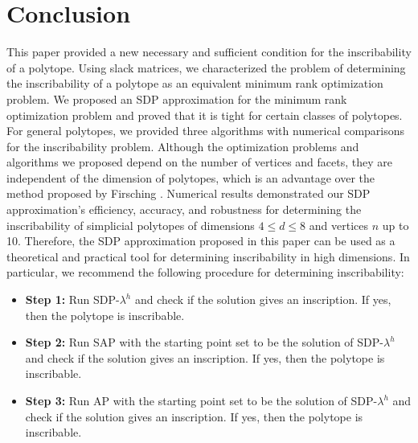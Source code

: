 \documentclass[smallextended, envcountsame]{svjour3}
\begin{document}

    

\section{Conclusion}\label{sec:conclusion}
    This paper provided a new necessary and sufficient condition for the inscribability of a polytope.  Using slack matrices, we characterized the problem of determining the inscribability of a polytope as an equivalent minimum rank optimization problem.  We proposed an SDP approximation for the minimum rank optimization problem and proved that it is tight for certain classes of polytopes.  For general polytopes, we provided three algorithms with numerical comparisons for the inscribability problem.  Although the optimization problems and algorithms we proposed depend on the number of vertices and facets, they are independent of the dimension of polytopes, which is an advantage over the method proposed by Firsching \cite{firsching2017realizability}.  Numerical results demonstrated our SDP approximation's efficiency, accuracy, and robustness for determining the inscribability of simplicial polytopes of dimensions $4\le d\le 8$ and vertices $n$ up to 10.  Therefore, the SDP approximation proposed in this paper can be used as a theoretical and practical tool for determining inscribability in high dimensions.  In particular, we recommend the following procedure for determining inscribability:
    \begin{itemize}
        \item {\bf Step 1:} Run SDP-$\lambda^h$ and check if the solution gives an inscription.  If yes, then the polytope is inscribable.
        \item {\bf Step 2:} Run SAP with the starting point set to be the solution of SDP-$\lambda^h$ and check if the solution gives an inscription.  If yes, then the polytope is inscribable.
        \item {\bf Step 3:} Run AP with the starting point set to be the solution of SDP-$\lambda^h$ and check if the solution gives an inscription.  If yes, then the polytope is inscribable.
    \end{itemize}
\end{document}
